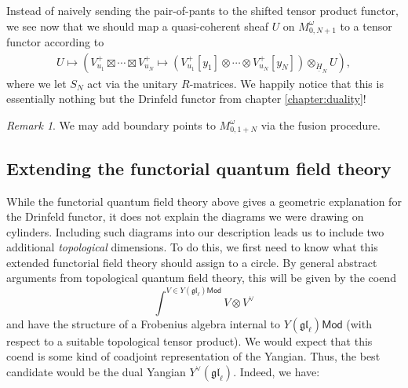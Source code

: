 \documentclass[11pt]{report}
\newtheorem{prop}[theorem]{Proposition}
\theoremstyle{definition}
\theoremstyle{remark}
\newtheorem*{remark}{Remark}
\theoremstyle{remark}
\newcommand{\Hom}{\operatorname{Hom}}
\newcommand{\C}{\mathbb{C}}
\begin{document}
Instead of naively sending the pair-of-pants to the shifted tensor product functor, we see now that we should map a quasi-coherent sheaf $U$ on $M_{0,N+1}^\omega$ to a tensor functor according to
\begin{align*}
U \mapsto (V_{u_1}^+ \boxtimes \cdots \boxtimes V_{u_N}^+ \mapsto (V_{u_1}^+[y_1] \otimes \cdots \otimes V_{u_N}^+[y_N]) \otimes_{\underline{\dot H}_N} U),
\end{align*}
where we let $S_N$ act via the unitary $R$-matrices. We happily notice that this is essentially nothing but the Drinfeld functor from chapter \ref{chapter:duality}!

\begin{remark}
We may add boundary points to $M_{0,1+N}^\omega$ via the fusion procedure.
\end{remark}


\subsection{Extending the functorial quantum field theory}

While the functorial quantum field theory above gives a geometric explanation for the Drinfeld functor, it does not explain the diagrams we were drawing on cylinders. Including such diagrams into our description leads us to include two additional \emph{topological} dimensions. To do this, we first need to know what this extended functorial field theory should assign to a circle. By general abstract arguments from topological quantum field theory, this will be given by the coend
\begin{equation*}
\int^{V \in Y(\mathfrak{gl}_\ell)\mathsf{Mod}} V \otimes V^\vee
\end{equation*}
and have the structure of a Frobenius algebra internal to $Y(\mathfrak{gl}_\ell)\mathsf{Mod}$ (with respect to a suitable topological tensor product). We would expect that this coend is some kind of coadjoint representation of the Yangian. Thus, the best candidate would be the dual Yangian $Y^\vee(\mathfrak{gl}_\ell)$. Indeed, we have:
\end{document}
